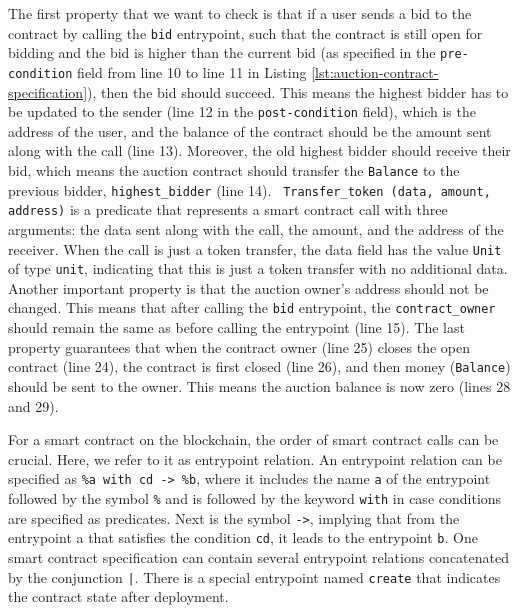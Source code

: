 \documentclass[a4paper,UKenglish,cleveref, autoref, thm-restate]{lipics-v2021}
\begin{document}
The first property that we want to check is that if a user sends a bid to the contract by calling the \lstinline/bid/ entrypoint, such that the contract is still open for bidding and the bid is higher than the current bid (as specified in the  \lstinline/pre-condition/ field from line 10 to line 11 in Listing \ref{lst:auction-contract-specification}), then the bid should succeed. This means the highest bidder has to be updated to the sender (line 12 in the \lstinline/post-condition/ field), which is the address of the user, and the balance of the contract should be the amount sent along with the call (line 13). Moreover, the old highest bidder should receive their bid, which means the auction contract should transfer the \lstinline/Balance/ to the previous bidder, \lstinline/highest_bidder/ (line 14).
 \lstinline/ Transfer_token (data, amount, address)/ is a predicate that represents a smart contract call with three arguments: the data sent along with the call, the amount, and the address of the receiver. When the call is just a token transfer, the data field has the value \lstinline/Unit/ of type \lstinline/unit/, indicating that this is just a token transfer with no additional data. Another important property is that the auction owner's address should not be changed. This means that after calling the \lstinline/bid/ entrypoint, the \lstinline/contract_owner/ should remain the same as before calling the entrypoint (line 15). The last property guarantees that when the contract owner (line 25) closes the open contract (line 24), the contract is first closed (line 26), and then money (\lstinline/Balance/) should be sent to the owner. This means the auction balance is now zero (lines 28 and 29).

For a smart contract on the blockchain, the order of smart contract calls can be crucial. Here, we refer to it as entrypoint relation. An entrypoint relation can be specified as \lstinline/%a with cd -> %b/, where it includes the name \lstinline/a/ of the entrypoint followed by the symbol \lstinline/%/ and is followed by the keyword \lstinline/with/ in case conditions are specified as predicates. Next is the symbol \lstinline/->/, implying that from the entrypoint a that satisfies the condition \lstinline/cd/, it leads to the entrypoint \lstinline/b/. One smart contract specification can contain several entrypoint relations concatenated by the conjunction \lstinline/|/. There is a special entrypoint named \lstinline/create/ that indicates the contract state after deployment.
\end{document}
